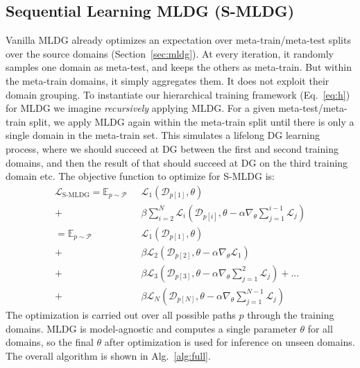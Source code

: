 \documentclass[runningheads]{llncs}
\newcommand{\nameS}{S-MLDG}
\begin{document}
\subsection{Sequential Learning MLDG (\nameS)}
Vanilla MLDG already optimizes an expectation over meta-train/meta-test splits over the source domains (Section~\ref{sec:mldg}). At every iteration, it randomly samples one domain as meta-test, and keeps the others as meta-train. But within the meta-train domains, it simply aggregates them. It does not exploit their domain grouping. To instantiate our hierarchical training framework (Eq.~\ref{eq:h}) for MLDG we imagine \emph{recursively} applying MLDG. For a given meta-test/meta-train split, we apply MLDG again within the meta-train split until there is only a single domain in the meta-train set. This simulates a lifelong DG learning process, where we should succeed at DG between the first and second training domains, and then the result of that should succeed at DG on the third training domain etc. The objective function to optimize for \nameS{} is:
\small
\begin{equation}
\begin{aligned}
\label{eq:hmldg}
\mathcal{L}_{\text{\nameS{}}} = \mathbb{E}_{p\sim\mathcal{P}}~~~ &\mathcal{L}_1( \mathcal{D}_{p[1]},\theta) \\
+ & \beta \sum_{i=2}^{N} \mathcal{L}_i( \mathcal{D}_{p[i]}, \theta-\alpha\nabla_\theta\sum_{j=1}^{i-1}\mathcal{L}_j)\\
=  \mathbb{E}_{p\sim\mathcal{P}}~~~ &\mathcal{L}_1( \mathcal{D}_{p[1]}, \theta) \\
+ &\beta\mathcal{L}_2(\mathcal{D}_{p[2]}, \theta - \alpha \nabla_\theta\mathcal{L}_1)\\
+ &\beta\mathcal{L}_3(\mathcal{D}_{p[3]}, \theta - \alpha \nabla_\theta\sum_{j=1}^{2}\mathcal{L}_{j}) + ... \\ 
+ &\beta\mathcal{L}_{N}(\mathcal{D}_{{p[N]}}, \theta - \alpha \nabla_\theta\sum_{j=1}^{N-1}\mathcal{L}_{j})
\end{aligned}
\end{equation}
\normalsize
The optimization is carried out over all possible paths $p$ through the training domains.  MLDG is model-agnostic and computes a single parameter $\theta$ for all domains, so the final $\theta$ after optimization is used for inference on unseen domains. The overall algorithm is shown in Alg.~\ref{alg:full}.
\end{document}
